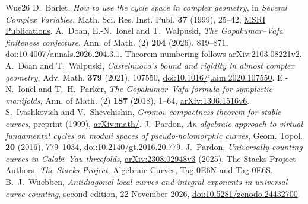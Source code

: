 \begin{thebibliography}{Wue26}
 D.~Barlet,
\emph{How to use the cycle space in complex geometry},
in \emph{Several Complex Variables}, Math. Sci. Res. Inst. Publ.
\textbf{37} (1999), 25--42,
\href{https://library.slmath.org/books/Book37/files/barlet.pdf}{MSRI Publications}.
 A.~Doan, E.-N.~Ionel and T.~Walpuski,
\emph{The Gopakumar--Vafa finiteness conjecture},
Ann. of Math. (2) \textbf{204} (2026), 819--871,
\href{https://doi.org/10.4007/annals.2026.204.3.1}{doi:10.4007/annals.2026.204.3.1}.
Theorem numbering follows \href{https://arxiv.org/abs/2103.08221v2}{arXiv:2103.08221v2}.
 A.~Doan and T.~Walpuski,
\emph{Castelnuovo's bound and rigidity in almost complex geometry},
Adv. Math. \textbf{379} (2021), 107550,
\href{https://doi.org/10.1016/j.aim.2020.107550}{doi:10.1016/j.aim.2020.107550}.
 E.-N.~Ionel and T.~H.~Parker,
\emph{The Gopakumar--Vafa formula for symplectic manifolds},
Ann. of Math. (2) \textbf{187} (2018), 1--64,
\href{https://arxiv.org/abs/1306.1516v6}{arXiv:1306.1516v6}.
 S.~Ivashkovich and V.~Shevchishin,
\emph{Gromov compactness theorem for stable curves}, preprint (1999),
\href{https://arxiv.org/abs/math/9903047}{arXiv:math/}.
 J.~Pardon,
\emph{An algebraic approach to virtual fundamental cycles on moduli
spaces of pseudo-holomorphic curves}, Geom. Topol. \textbf{20} (2016),
779--1034, \href{https://doi.org/10.2140/gt.2016.20.779}{doi:10.2140/gt.2016.20.779}.
 J.~Pardon,
\emph{Universally counting curves in Calabi--Yau threefolds},
\href{https://arxiv.org/abs/2308.02948v3}{arXiv:2308.02948v3} (2025).
 The Stacks Project Authors,
\emph{The Stacks Project}, Algebraic Curves,
\href{https://stacks.math.columbia.edu/tag/0E6N}{Tag 0E6N} and
\href{https://stacks.math.columbia.edu/tag/0E6S}{Tag 0E6S}.
 B.~J.~Wuebben,
\emph{Antidiagonal local curves and integral exponents in universal curve counting},
second edition, 22 November 2026,
\href{https://doi.org/10.5281/zenodo.24432700}{doi:10.5281/\allowbreak zenodo.24432700}.
\end{thebibliography}
